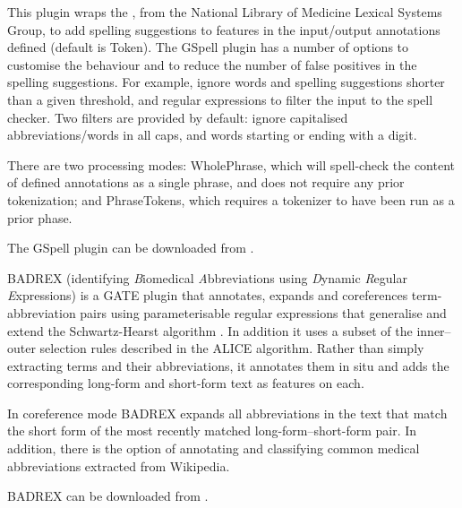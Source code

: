 This plugin wraps the , from the National Library of Medicine Lexical Systems Group, to add spelling suggestions to features in the input/output annotations defined (default is Token). The GSpell plugin has a number of options to customise the behaviour and to reduce the number of false positives in the spelling suggestions. For example, ignore words and spelling suggestions shorter than a given threshold, and regular expressions to filter the input to the spell checker. Two filters are provided by default: ignore capitalised abbreviations/words in all caps, and words starting or ending with a digit. 

There are two processing modes: WholePhrase, which will spell-check the content of defined annotations as a single phrase, and does not require any prior tokenization; and PhraseTokens, which requires a tokenizer to have been run as a prior phase.

The GSpell plugin can be downloaded from .

BADREX (identifying \emph{B}iomedical \emph{A}bbreviations using \emph{D}ynamic \emph{R}egular \emph{E}xpressions)\cite{Gooch12} is a GATE plugin that annotates, expands and coreferences term-abbreviation pairs using parameterisable regular expressions that generalise and extend the Schwartz-Hearst algorithm \cite{Schwartz03}. In addition it uses a subset of the inner--outer selection rules described in the \cite{Ao05} ALICE algorithm. Rather than simply extracting terms and their abbreviations, it annotates them in situ and adds the corresponding long-form and short-form text as features on each.

In coreference mode BADREX expands all abbreviations in the text that match the short form of the most recently matched long-form--short-form pair. In addition, there is the option of annotating and classifying common medical abbreviations extracted from Wikipedia.

BADREX can be downloaded from .


